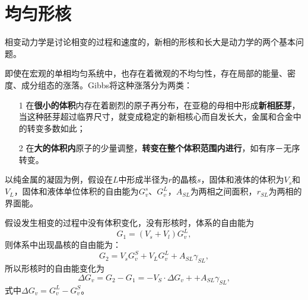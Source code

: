     \section{均匀形核}
        相变动力学是讨论相变的过程和速度的，新相的形核和长大是动力学的两个基本问题。

        即使在宏观的单相均匀系统中，也存在着微观的不均匀性，存在局部的能量、密度、成分组态的涨落。Gibbs将这种涨落分为两类：
        \begin{enumerate}
            \item[1] 在\textbf{很小的体积}内存在着剧烈的原子再分布，在亚稳的母相中形成\textbf{新相胚芽}，当这种胚芽超过临界尺寸，就变成稳定的新相核心而自发长大，金属和合金中的转变多数如此；
            \item[2] 在\textbf{大的体积内}原子的少量调整，\textbf{转变在整个体积范围内进行}，如有序－无序转变。
        \end{enumerate}

        以纯金属的凝固为例，假设在$L$中形成半径为$r$的晶核$s$，固体和液体的体积为$V_s$和$V_L$，固体和液体单位体积的自由能为$G_v^s$、$G_v^L$，$A_{SL}$为两相之间面积，$r_{SL}$为两相的界面能。

        假设发生相变的过程中没有体积变化，没有形核时，体系的自由能为
        \begin{equation}
            G_1=\left( V_s+V_l \right)G_v^L,
        \end{equation}
        则体系中出现晶核的自由能为：
        \begin{equation}
            G_2=V_sG_v^S+V_LG_v^L+A_{SL}\gamma_{SL},
        \end{equation}
        所以形核时的自由能变化为
        \begin{equation}
            \Delta G_v=G_2-G_1=-V_S\cdot \Delta G_v++A_{SL}\gamma_{SL},
        \end{equation}
        式中$\Delta G_v=G_v^L-G_v^S$。
        
